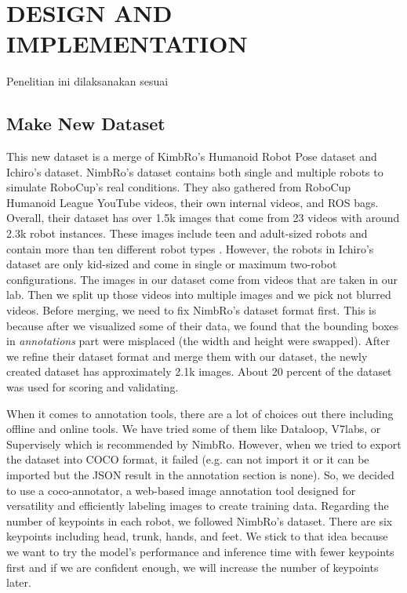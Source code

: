 \chapter{DESIGN AND IMPLEMENTATION}
\label{chap:desainandimplementation}


Penelitian ini dilaksanakan sesuai \lipsum[1][1-5]

\section{Make New Dataset}
\label{sec:makenewdataset}

This new dataset is a merge of KimbRo's Humanoid Robot Pose dataset and Ichiro's dataset. NimbRo's dataset contains both single and multiple robots to
simulate RoboCup's real conditions. They also gathered from RoboCup Humanoid League YouTube videos, their own internal videos, and ROS bags. 
Overall, their dataset has over 1.5k images that come from 23 videos with around 2.3k robot instances. These images include teen and adult-sized robots and contain more than ten different robot types \parencite{amini2021}.
However, the robots in Ichiro's dataset are only kid-sized and come in single or maximum two-robot configurations. The images in our dataset come from videos that are taken in our lab. 
Then we split up those videos into multiple images and we pick not blurred videos.
Before merging, we need to fix NimbRo's dataset format first. This is because after we visualized some of their data, we found that the bounding boxes in \emph{annotations} part were misplaced (the width and height were swapped).
After we refine their dataset format and merge them with our dataset, the newly created dataset has approximately 2.1k images.
About 20 percent of the dataset was used for scoring and validating.

When it comes to annotation tools, there are a lot of choices out there including offline and online tools. We have tried some of them like Dataloop, V7labs, or Supervisely which is recommended by NimbRo.
However, when we tried to export the dataset into COCO format, it failed (e.g. can not import it or it can be imported but the JSON result in the annotation section is none). So, we decided to use a coco-annotator,
a web-based image annotation tool designed for versatility and efficiently labeling images to create training data. Regarding the number of keypoints in each robot, we followed NimbRo's dataset.
There are six keypoints including head, trunk, hands, and feet. We stick to that idea because we want to try the model's performance and inference time with fewer keypoints first and if we are confident enough, we will increase the number of keypoints later.


